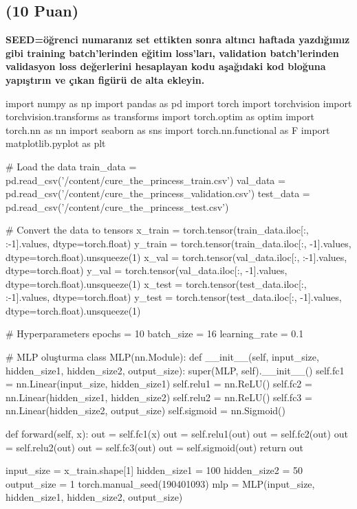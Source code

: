 \documentclass[11pt]{article}
\begin{document}
\subsection{(10 Puan)} \textbf{SEED=öğrenci numaranız set ettikten sonra altıncı haftada yazdığımız gibi training batch'lerinden eğitim loss'ları, validation batch'lerinden validasyon loss değerlerini hesaplayan kodu aşağıdaki kod bloğuna yapıştırın ve çıkan figürü de alta ekleyin.}

\begin{python}
import numpy as np
import pandas as pd
import torch
import torchvision
import torchvision.transforms as transforms
import torch.optim as optim
import torch.nn as nn
import seaborn as sns
import torch.nn.functional as F
import matplotlib.pyplot as plt

# Load the data
train_data = pd.read_csv('/content/cure_the_princess_train.csv')
val_data = pd.read_csv('/content/cure_the_princess_validation.csv')
test_data = pd.read_csv('/content/cure_the_princess_test.csv')

# Convert the data to tensors
x_train = torch.tensor(train_data.iloc[:, :-1].values, dtype=torch.float)
y_train = torch.tensor(train_data.iloc[:, -1].values, dtype=torch.float).unsqueeze(1)
x_val = torch.tensor(val_data.iloc[:, :-1].values, dtype=torch.float)
y_val = torch.tensor(val_data.iloc[:, -1].values, dtype=torch.float).unsqueeze(1)
x_test = torch.tensor(test_data.iloc[:, :-1].values, dtype=torch.float)
y_test = torch.tensor(test_data.iloc[:, -1].values, dtype=torch.float).unsqueeze(1)

# Hyperparameters
epochs = 10
batch_size = 16
learning_rate = 0.1

# MLP oluşturma
class MLP(nn.Module):
    def __init__(self, input_size, hidden_size1, hidden_size2, output_size):
        super(MLP, self).__init__()
        self.fc1 = nn.Linear(input_size, hidden_size1)
        self.relu1 = nn.ReLU()
        self.fc2 = nn.Linear(hidden_size1, hidden_size2)
        self.relu2 = nn.ReLU()
        self.fc3 = nn.Linear(hidden_size2, output_size)
        self.sigmoid = nn.Sigmoid()

    def forward(self, x):
        out = self.fc1(x)
        out = self.relu1(out)
        out = self.fc2(out)
        out = self.relu2(out)
        out = self.fc3(out)
        out = self.sigmoid(out)
        return out

input_size = x_train.shape[1]
hidden_size1 = 100
hidden_size2 = 50
output_size = 1
torch.manual_seed(190401093)
mlp = MLP(input_size, hidden_size1, hidden_size2, output_size)


\end{python}
\end{document}

